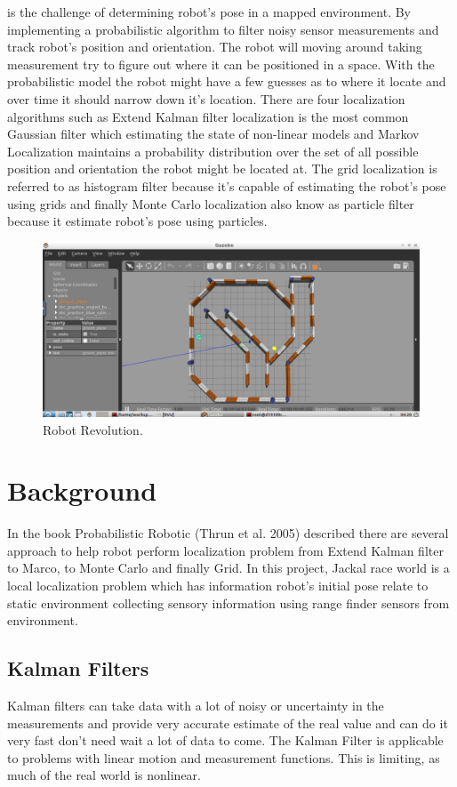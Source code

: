 \documentclass[10pt,journal,compsoc]{IEEEtran}
\begin{document}
 is the challenge of determining robot's pose in a mapped environment. By implementing a probabilistic algorithm to filter noisy sensor measurements
 and track robot's position and orientation. The robot will moving around taking measurement try to figure out where it can be positioned in a space. With the probabilistic model the robot might have a few guesses as to where it locate and over time it should narrow down it's location. There are four localization algorithms such as Extend Kalman filter localization is the most common Gaussian filter which estimating the state of non-linear models and Markov Localization maintains a probability distribution over the set of all possible position and orientation the robot might be located at. The grid localization is referred to as histogram filter because it's capable of estimating the robot's pose using grids and finally Monte Carlo localization also know as particle filter because it estimate robot's pose using particles.
\begin{figure}[thpb]
      \centering
      \includegraphics[width=\linewidth]{MapRobot.png}
      \caption{Robot Revolution.}
      \label{fig:robot1}
\end{figure}

\section{Background}
In the book Probabilistic Robotic (Thrun et al. 2005) described there are several approach to help robot perform localization problem from Extend Kalman filter to Marco, to Monte Carlo and finally Grid. In this project, Jackal race world is a local localization problem which has information robot's initial pose relate to static environment collecting sensory information using range finder sensors from environment.

\subsection{Kalman Filters}
 Kalman filters can take data with a lot of noisy or uncertainty in the measurements and provide very accurate estimate of the real value and can do it very fast don't need wait a lot of data to come. The Kalman Filter is applicable to problems with linear motion and measurement functions. This is limiting, as much of the real world is nonlinear.
 
\end{document}
